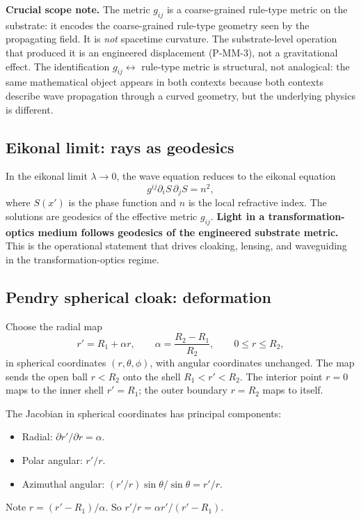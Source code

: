 \documentclass[11pt,a4paper]{article}
\begin{document}
\textbf{Crucial scope note.} The metric $g_{ij}$ is a coarse-grained rule-type metric on the substrate: it encodes the coarse-grained rule-type geometry seen by the propagating field. It is \emph{not} spacetime curvature. The substrate-level operation that produced it is an engineered displacement (P-MM-3), not a gravitational effect. The identification $g_{ij} \leftrightarrow$ rule-type metric is structural, not analogical: the same mathematical object appears in both contexts because both contexts describe wave propagation through a curved geometry, but the underlying physics is different.

\subsection{Eikonal limit: rays as geodesics}

In the eikonal limit $\lambda \to 0$, the wave equation reduces to the eikonal equation
\[
g^{ij}\partial_i S\,\partial_j S = n^2,
\]
where $S(x')$ is the phase function and $n$ is the local refractive index. The solutions are geodesics of the effective metric $g_{ij}$. \textbf{Light in a transformation-optics medium follows geodesics of the engineered substrate metric.} This is the operational statement that drives cloaking, lensing, and waveguiding in the transformation-optics regime.

\subsection{Pendry spherical cloak: deformation}

Choose the radial map
\[
r' = R_1 + \alpha r, \qquad \alpha = \frac{R_2 - R_1}{R_2}, \qquad 0 \le r \le R_2,
\]
in spherical coordinates $(r, \theta, \phi)$, with angular coordinates unchanged. The map sends the open ball $r < R_2$ onto the shell $R_1 < r' < R_2$. The interior point $r = 0$ maps to the inner shell $r' = R_1$; the outer boundary $r = R_2$ maps to itself.

The Jacobian in spherical coordinates has principal components:
\begin{itemize}[noitemsep]
\item Radial: $\partial r'/\partial r = \alpha$.
\item Polar angular: $r'/r$.
\item Azimuthal angular: $(r'/r)\sin\theta/\sin\theta = r'/r$.
\end{itemize}

Note $r = (r' - R_1)/\alpha$. So $r'/r = \alpha r'/(r' - R_1)$.
\end{document}
